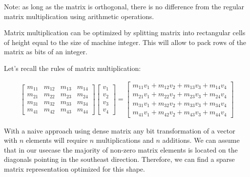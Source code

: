 \documentclass{article}
\begin{document}
Note: as long as the matrix is orthogonal, there is no difference from the regular matrix multiplication using arithmetic operations.

Matrix multiplication can be optimized by splitting matrix into rectangular cells of height equal to the size of machine integer.
This will allow to pack rows of the matrix as bits of an integer.

Let's recall the rules of matrix multiplication:

\begin{equation}
  \label{eq:vmul1}
  \begin{split}
    \begin{bmatrix}
      m_{1 1} & m_{1 2} & m_{1 3} & m_{1 4} \\
      m_{2 1} & m_{2 2} & m_{2 3} & m_{2 4} \\
      m_{3 1} & m_{3 2} & m_{3 3} & m_{3 4} \\
      m_{4 1} & m_{4 2} & m_{4 3} & m_{4 4}
    \end{bmatrix}
    \begin{bmatrix}
      v_1 \\
      v_2 \\
      v_3 \\
      v_4
    \end{bmatrix}
    =
    \begin{bmatrix}
      m_{1 1} v_1 + m_{1 2}   v_2 + m_{1 3}   v_3 + m_{1 4} v_4 \\
      m_{2 1} v_1 + m_{2 2}   v_2 + m_{2 3}   v_3 + m_{2 4} v_4 \\
      m_{3 1} v_1 + m_{3 2}   v_2 + m_{3 3}   v_3 + m_{3 4} v_4 \\
      m_{4 1} v_1 + m_{4 2}   v_2 + m_{4 3}   v_3 + m_{4 4} v_4
    \end{bmatrix}
  \end{split}
\end{equation}

With a naive approach using dense matrix any bit transformation of a vector with $n$ elements will require $n$ multiplications and $n$ additions.
We can assume that in our usecase the majority of non-zero matrix elements is located on the diagonals pointing in the southeast direction.
Therefore, we can find a sparse matrix representation optimized for this shape.

\newcommand{\dcolor}[1]{%
  \ifcase #1%
    green%
  \or%
    blue%
  \or%
    red%
  \or%
    cyan%
  \fi%
}

\newcommand{\diagcolor}[2]{%
  \ifnum #1<#2
    \dcolor{\numexpr 4-#2+#1}%
  \else%
    \dcolor{\numexpr #1-#2}%
  \fi%
}
\end{document}
